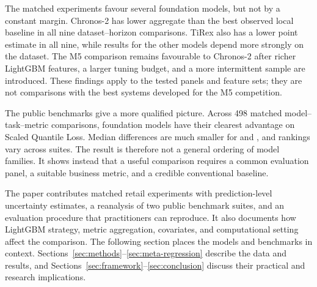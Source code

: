 The matched experiments favour several foundation models, but not by a
constant margin. Chronos-2 has lower aggregate \WAPE{} than the best observed
local baseline in all nine dataset--horizon comparisons. TiRex also has a
lower point estimate in all nine, while results for the other models depend
more strongly on the dataset. The M5 comparison remains favourable to
Chronos-2 after richer LightGBM features, a larger tuning budget, and a more
intermittent sample are introduced. These findings apply to the tested panels
and feature sets; they are not comparisons with the best systems developed for
the M5 competition.

The public benchmarks give a more qualified picture. Across 498 matched
model--task--metric comparisons, foundation models have their clearest
advantage on Scaled Quantile Loss. Median differences are much smaller for
\WAPE{} and \MASE{}, and rankings vary across suites. The result is therefore
not a general ordering of model families. It shows instead that a useful
comparison requires a common evaluation panel, a suitable business metric,
and a credible conventional baseline.

The paper contributes matched retail experiments with prediction-level
uncertainty estimates, a reanalysis of two public benchmark suites, and an
evaluation procedure that practitioners can reproduce. It also documents how
LightGBM strategy, metric aggregation, covariates, and computational setting
affect the comparison. The following section places the models and benchmarks
in context. Sections~\ref{sec:methods}--\ref{sec:meta-regression} describe the
data and results, and Sections~\ref{sec:framework}--\ref{sec:conclusion}
discuss their practical and research implications.
